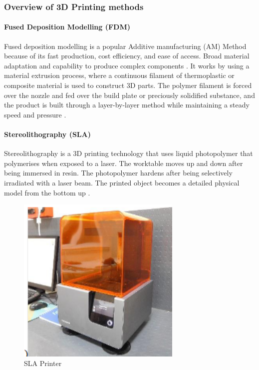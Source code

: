 \subsubsection{Overview of 3D Printing methods}

\paragraph{Fused Deposition Modelling (FDM)}

Fused deposition modelling is a popular Additive manufacturing (AM) Method because of its fast production, cost efficiency, and ease of access. 
Broad material adaptation and capability to produce complex components \cite{RefWorks:RefID:89-rajan2022fused}. 
It works by using a material extrusion process, where a continuous filament of thermoplastic or composite material is used to construct 3D parts. 
The polymer filament is forced over the nozzle and fed over the build plate or preciously solidified substance, and the product is built through a layer-by-layer method while maintaining a steady speed and pressure \cite{RefWorks:RefID:86-lee2017fundamentals}. 

\paragraph{Stereolithography (SLA)}

Stereolithography is a 3D printing technology that uses liquid photopolymer that polymerises when exposed to a laser. 
The worktable moves up and down after being immersed in resin.  
The photopolymer hardens after being selectively irradiated with a laser beam. 
The printed object becomes a detailed physical model from the bottom up \cite{RefWorks:RefID:63-yankov2017comparison}.

\begin{figure}[htbp]
    \centering
    \includegraphics[width=0.7\textwidth]{figures/CAD-3DPrint/SLAPrinter.png}
    \caption{SLA Printer}
    \label{fig:SLA}
\end{figure}


